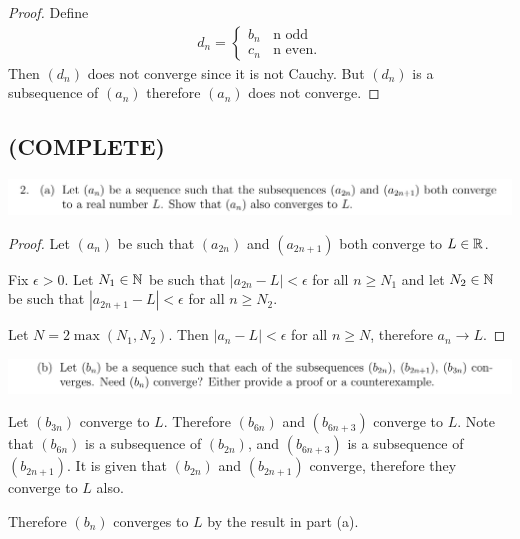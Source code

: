 \documentclass[12pt]{article}
\begin{document}
\begin{enumerate}[label=(\alph*)]
\begin{proof}
    Define
    \begin{align*}
      d_n =
      \begin{cases}
        b_n ~~~~\text{n odd}\\
        c_n ~~~~\text{n even}.
      \end{cases}
    \end{align*}
    Then $(d_n)$ does not converge since it is not Cauchy. But $(d_n)$ is a subsequence of $(a_n)$
    therefore $(a_n)$ does not converge.
  \end{proof}
\end{enumerate}


\newpage
\subsection{(COMPLETE)}
\begin{mdframed}
\includegraphics[width=400pt]{img/oxford-M2-analysis-I-4-2-a.png}
\end{mdframed}

\begin{proof}
  Let $(a_n)$ be such that $(a_{2n})$ and $(a_{2n + 1})$ both converge to $L \in \mathbb{R}$.

  Fix $\epsilon > 0$. Let $N_1 \in \mathbb{N}$ be such that $|a_{2n} - L| < \epsilon$ for all $n \geq N_1$
  and let $N_2 \in \mathbb{N}$ be such that $|a_{2n + 1} - L| < \epsilon$ for all $n \geq N_2$.

  Let $N = 2\max(N_1, N_2)$. Then $|a_n - L| < \epsilon$ for all $n \geq N$, therefore $a_n \to L$.
\end{proof}

\begin{mdframed}
\includegraphics[width=400pt]{img/oxford-M2-analysis-I-4-2-b.png}
\end{mdframed}

Let $(b_{3n})$ converge to $L$. Therefore $(b_{6n})$ and $(b_{6n + 3})$ converge to $L$. Note that
$(b_{6n})$ is a subsequence of $(b_{2n})$, and $(b_{6n + 3})$ is a subsequence of $(b_{2n +
  1})$. It is given that $(b_{2n})$ and $(b_{2n + 1})$ converge, therefore they converge to $L$
also.

Therefore $(b_n)$ converges to $L$ by the result in part (a).
\end{document}
